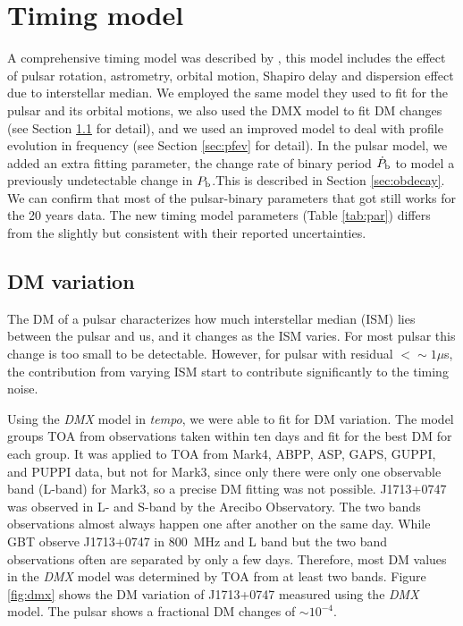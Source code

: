 \section{Timing model}
\label{timing_model}
A comprehensive timing model was described by \citet{sns+05}, this model includes the effect of pulsar rotation, astrometry, orbital motion, Shapiro delay and dispersion effect due to interstellar median.
We employed the same \citet{dd86} model they used to fit for the pulsar and its orbital motions, we also used the DMX model to fit DM changes (see Section \ref{sec:dmx} for detail), and we used an improved model to deal with profile evolution in frequency (see Section \ref{sec:pfev} for detail). 
In the pulsar model, we added an extra fitting parameter, the change rate of binary period $\dot{P}_{\rm b}$ to model a previously undetectable change in $P_{\rm b}$.This is described in Section \ref{sec:obdecay}.    
We can confirm that most of the pulsar-binary parameters that \citet{sns+05} got still works for the 20 years data. The new timing model parameters (Table \ref{tab:par}) differs from the \citet{sns+05} slightly but consistent with their reported uncertainties.

\subsection{DM variation}
\label{sec:dmx}
The DM of a pulsar characterizes how much interstellar median (ISM) lies
between the pulsar and us, and it changes as the ISM varies. For most pulsar
this change is too small to be detectable. However, for pulsar with residual
$<\sim1\mu$s, the contribution from varying ISM start to contribute
significantly to the timing noise. 

Using the {\it DMX} model in {\it tempo}, we were able to fit for DM
variation. 
The model groups TOA from observations taken within ten days and fit for the
best DM for each group.   
It was applied to TOA from Mark4, ABPP, ASP, GAPS, GUPPI, and PUPPI data, but
not for Mark3, since only there were only one observable band (L-band) for
Mark3, so a precise DM fitting was not possible.
J1713+0747 was observed in L- and S-band by the Arecibo Observatory. The
two bands observations almost always happen one after another on the same day.
While GBT observe J1713+0747 in 800~MHz and L band but the two band
observations often are separated by only a few days.
Therefore, most DM values in the {\it DMX} model was determined by TOA from at
least two bands. Figure \ref{fig:dmx} shows the DM variation of J1713+0747 
measured using the {\it DMX} model.
The pulsar shows a fractional DM changes of $\sim10^{-4}$.



